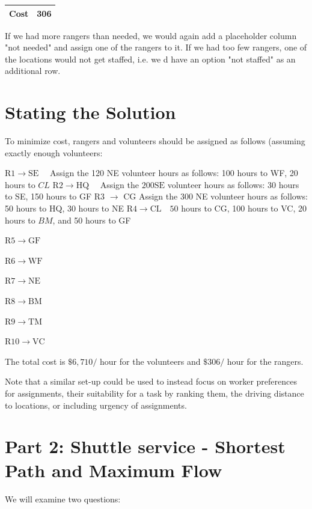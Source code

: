 \documentclass[10pt]{article}
\begin{document}
\begin{tabular}{|l|l|}
\hline
Cost & 306 \\
\hline
\end{tabular}

If we had more rangers than needed, we would again add a placeholder column "not needed" and assign one of the rangers to it. If we had too few rangers, one of the locations would not get staffed, i.e. we d have an option "not staffed" as an additional row.

\section{Stating the Solution}
To minimize cost, rangers and volunteers should be assigned as follows (assuming exactly enough volunteers:

$\mathrm{R} 1 \rightarrow \mathrm{SE} \quad$ Assign the 120 NE volunteer hours as follows: 100 hours to WF, 20 hours to $C L$ $\mathrm{R} 2 \rightarrow \mathrm{HQ} \quad$ Assign the $200 \mathrm{SE}$ volunteer hours as follows: 30 hours to SE, 150 hours to GF R3 $\rightarrow$ CG Assign the 300 NE volunteer hours as follows: 50 hours to HQ, 30 hours to NE $\mathrm{R} 4 \rightarrow \mathrm{CL} \quad 50$ hours to CG, 100 hours to VC, 20 hours to $B M$, and 50 hours to GF

$\mathrm{R} 5 \rightarrow \mathrm{GF}$

$\mathrm{R} 6 \rightarrow \mathrm{WF}$

$\mathrm{R} 7 \rightarrow \mathrm{NE}$

$\mathrm{R} 8 \rightarrow \mathrm{BM}$

$\mathrm{R} 9 \rightarrow \mathrm{TM}$

$\mathrm{R} 10 \rightarrow \mathrm{VC}$

The total cost is $\$ 6,710 /$ hour for the volunteers and $\$ 306 /$ hour for the rangers.

Note that a similar set-up could be used to instead focus on worker preferences for assignments, their suitability for a task by ranking them, the driving distance to locations, or including urgency of assignments.

\section{Part 2: Shuttle service - Shortest Path and Maximum Flow}
We will examine two questions:
\end{document}
